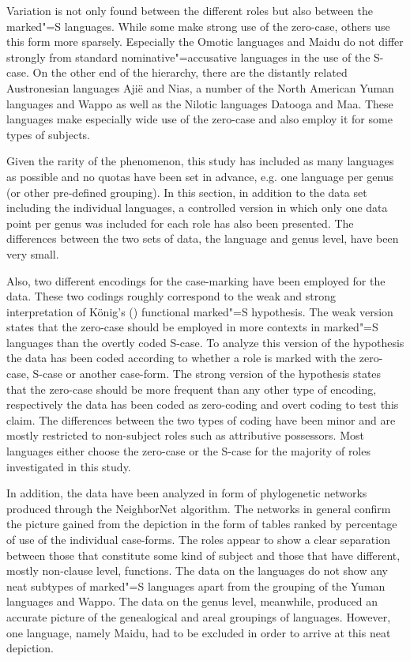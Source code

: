 Variation is not only found between the different roles but also between the marked"=S languages. 
While some make strong use of the zero-case, others use this form more sparsely. 
Especially the Omotic languages and Maidu do not differ strongly from standard nominative"=accusative languages in the use of the S-case. 
On the other end of the hierarchy, there are the distantly related Austronesian languages Aji\"e and Nias, a number of the North American Yuman languages and Wappo as well as the Nilotic languages Datooga and Maa. 
These languages make especially wide use of the zero-case and also employ it for some types of subjects. 

Given the rarity of the phenomenon, this study has included as many languages as possible and no quotas have been set in advance, e.g. one language per genus (or other pre-defined grouping). 
In this section, in addition to the data set including the individual languages, a controlled version in which only one data point per genus was included for each role has also been presented. 
The differences between the two sets of data, the language and genus level, have been very small. 

Also, two different encodings for the case-marking have been employed for the data. 
These two codings roughly correspond to the weak and strong interpretation of K\"onig's (\citeyear{Koenig:2006}) functional marked"=S hypothesis. 
The weak version states that the zero-case should be employed in more contexts in marked"=S languages than the overtly coded S-case. 
To analyze this version of the hypothesis the data has been coded according to whether a role is marked with the zero-case, S-case or another case-form. 
The strong version of the hypothesis states that the zero-case should be more frequent than any other type of encoding, respectively the data has been coded as zero-coding and overt coding to test this claim.
The differences between the two types of coding have been minor and are mostly restricted to non-subject roles such as attributive possessors.
Most languages either choose the zero-case or the S-case for the majority of roles investigated in this study.

In addition, the data have been analyzed in form of phylogenetic networks produced through the NeighborNet algorithm. 
The networks in general confirm the picture gained from the depiction in the form of tables ranked by percentage of use of the individual case-forms.
The roles appear to show a clear separation between those that constitute some kind of subject and those that have different, mostly non-clause level, functions. 
The data on the languages do not show any neat subtypes of marked"=S languages apart from the grouping of the Yuman languages and Wappo.
The data on the genus level, meanwhile, produced an accurate picture of the genealogical and areal groupings of languages. 
However, one language, namely Maidu, had to be excluded in order to arrive at this neat depiction. 

